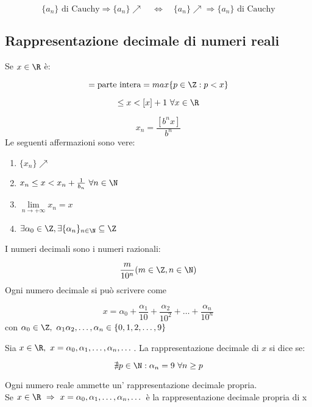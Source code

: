 \documentclass[../analisi.tex]{subfiles}
\begin{document}
\begin{equation}
	\{ a_n \} \mbox{ di Cauchy} \Rightarrow \{ a_n \} \nearrow \quad \iff
 	\quad \{ a_n \}  \nearrow \Rightarrow  \{a_n \}  \mbox{ di Cauchy}
\end{equation}
\subsection{Rappresentazione decimale di numeri reali}
Se $ x \in \R $ è:

\begin{equation}
	[ x ] = \mbox{parte intera} = max\{ p \in \Z: p < x \} 
\end{equation}
\bda

\begin{equation}
	[ x ] \leq x < [ x ] + 1\ \forall x \in \R 
\end{equation}
\bda 

\begin{equation}
	x_n = \frac{[b^nx]}{b^n}
\end{equation}
Le seguenti affermazioni sono vere:

\begin{enumerate}
	\item $\{ x_n \} \nearrow $ 
	\item $x_n \leq x < x_n + \frac{1}{b_n}\ \forall n \in \N $
	\item $\lim \limits_{n \to + \infty} x_n = x $
	\item $\exists \alpha_0 \in \Z, \exists \{ \alpha_n \}_{n \in \N} \subseteq \Z $
\end{enumerate}


\begin{defn}[Decimali]
I numeri decimali sono i numeri razionali:

\begin{equation}
	\frac{m}{10^n} ( m \in \Z, n \in \N )
\end{equation}
Ogni numero decimale si può scrivere come 

\begin{equation}
	x = \alpha_0 + \frac{\alpha_1}{10} + \frac{\alpha_2}{10^2} + \dots + \frac{\alpha_n}{10^n}
\end{equation}
con $ \alpha_0 \in \Z,\ \alpha_1 \alpha_2, \dots, \alpha_n \in \{ 0,1,2,\dots,9 \}$

\end{defn}

\begin{defn}
Sia $ x \in \R,\ x = \alpha_0, \alpha_1, \dots, \alpha_n, \dots$.
La rappresentazione decimale di $x$ si dice  se:

\begin{equation}
	\nexists p \in \N : \alpha_n = 9\ \forall n \geq p
\end{equation}
\end{defn}
Ogni numero reale ammette un' rappresentazione decimale propria.\\
Se $ x \in \R\ \Rightarrow\ x = \alpha_0, \alpha_1, \dots, \alpha_n, \dots$
è la rappresentazione decimale propria di x 
\end{document}
